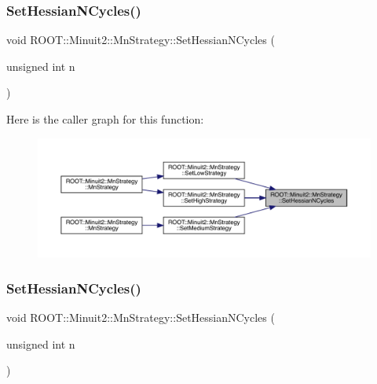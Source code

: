 \mbox{\label{classROOT_1_1Minuit2_1_1MnStrategy_a7d97d197e18c686e2cdb826ea514de28}} 
\subsubsection{\texorpdfstring{SetHessianNCycles()}{SetHessianNCycles()}\hspace{0.1cm}{\footnotesize\ttfamily [2/3]}}
{\footnotesize\ttfamily void R\+O\+O\+T\+::\+Minuit2\+::\+Mn\+Strategy\+::\+Set\+Hessian\+N\+Cycles (\begin{DoxyParamCaption}\item[{unsigned int}]{n }\end{DoxyParamCaption})\hspace{0.3cm}{\ttfamily [inline]}}

Here is the caller graph for this function\+:
\nopagebreak
\begin{figure}[H]
\begin{center}
\leavevmode
\includegraphics[width=350pt]{da/de4/classROOT_1_1Minuit2_1_1MnStrategy_a7d97d197e18c686e2cdb826ea514de28_icgraph}
\end{center}
\end{figure}
\mbox{\label{classROOT_1_1Minuit2_1_1MnStrategy_a7d97d197e18c686e2cdb826ea514de28}} 
\subsubsection{\texorpdfstring{SetHessianNCycles()}{SetHessianNCycles()}\hspace{0.1cm}{\footnotesize\ttfamily [3/3]}}
{\footnotesize\ttfamily void R\+O\+O\+T\+::\+Minuit2\+::\+Mn\+Strategy\+::\+Set\+Hessian\+N\+Cycles (\begin{DoxyParamCaption}\item[{unsigned int}]{n }\end{DoxyParamCaption})\hspace{0.3cm}{\ttfamily [inline]}}

